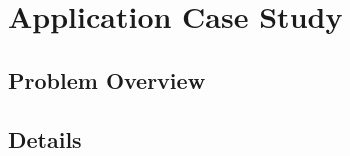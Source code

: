 \section{Application Case Study}
\label{casestudy}

\subsection{Problem Overview}
 
\subsection{Details}
 